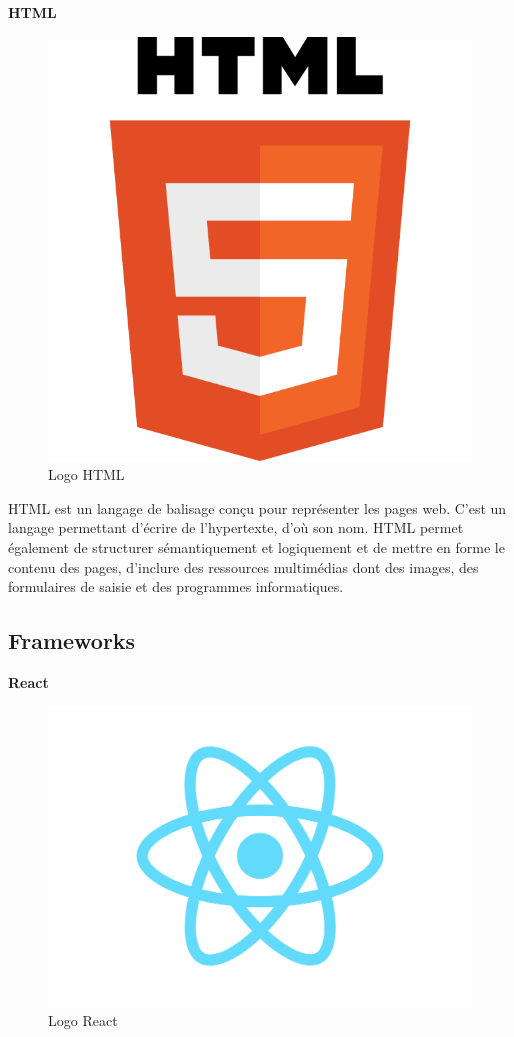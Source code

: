 \large
\textbf{HTML}
\begin{figure}[htbp]
   \centering
   \includegraphics[scale=0.2]{Images/html.png} 
   \caption{Logo HTML}
   \label{fig:html}
\end{figure}

HTML est un langage de balisage conçu pour représenter les pages
 web. C’est un langage permettant d’écrire de l’hypertexte, 
 d’où son nom. HTML permet également de structurer sémantiquement 
 et logiquement et de mettre en forme le contenu des pages, 
 d’inclure des ressources multimédias dont des images, des 
 formulaires de saisie et des programmes informatiques.

 

\subsection{Frameworks}
\large
\textbf{React}
\begin{figure}[htbp]
   \centering
   \includegraphics[scale=0.1]{Images/react.png} 
   \caption{Logo React}
   \label{fig:react}
\end{figure}

